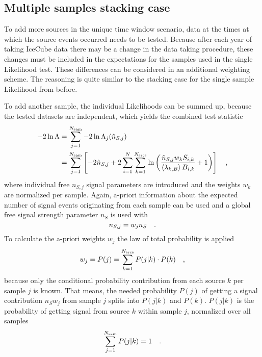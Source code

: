 \subsection{Multiple samples stacking case}
To add more sources in the unique time window scenario, data at the times at which the source events occurred needs to be tested.
Because after each year of taking IceCube data there may be a change in the data taking procedure, these changes must be included in the expectations for the samples used in the single Likelihood test.
These differences can be considered in an additional weighting scheme.
The reasoning is quite similar to the stacking case for the single sample Likelihood from before.

To add another sample, the individual Likelihoods can be summed up, because the tested datasets are independent, which yields the combined test statistic
\begin{align}
  -2\ln\Lambda
  &= \sum_{j=1}^{N_\text{sam}} -2\ln\Lambda_j(\hat{n}_{S,j}) \\
  &= \sum_{j=1}^{N_\text{sam}} \left[
        -2\hat{n}_{S,j} +
        2\sum_{i=1}^N \sum_{k=1}^{N_\text{srcs}} \ln\left(
          \frac{\hat{n}_{S,j} w_k S_{i,k}}{\Braket{\lambda_{k,B}} B_{i,k}}
          + 1
        \right)
      \right]
  \quad\text{,}
\end{align}
where individual free $n_{S,j}$ signal parameters are introduced and the weights $w_k$ are normalized per sample.
Again, a-priori information about the expected number of signal events originating from each sample can be used and a global free signal strength parameter $n_S$ is used with
\begin{equation}
  n_{S,j} = w_j n_S
  \quad\text{.}
\end{equation}
To calculate the a-priori weights $w_j$ the law of total probability is applied 
\begin{equation}
  w_j = P(j) = \sum_{k=1}^{N_\text{srcs}} P(j|k)\cdot P(k)
  \quad\text{,}
\end{equation}
because only the conditional probability contribution from each source $k$ per sample $j$ is known.
That means, the needed probability $P(j)$ of getting a signal contribution $n_S w_j$ from sample $j$ splits into $P(j|k)$ and $P(k)$.
$P(j|k)$ is the probability of getting signal from source $k$ within sample $j$, normalized over all samples
\begin{equation}
  \sum_{j=1}^{N_\text{sam}} P(j|k) = 1
  \quad\text{.}
\end{equation}
